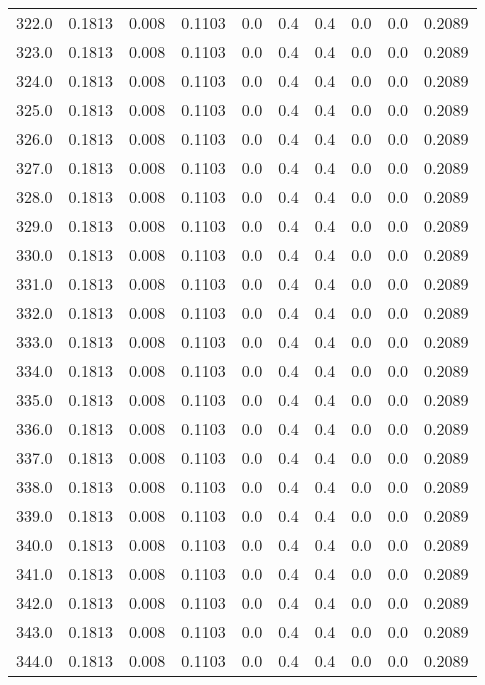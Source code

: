 \begin{longtable}{lrrrrrrrrr}
322.0 & 0.1813 & 0.008 & 0.1103 & 0.0 & 0.4 & 0.4 & 0.0 & 0.0 & 0.2089 \\
323.0 & 0.1813 & 0.008 & 0.1103 & 0.0 & 0.4 & 0.4 & 0.0 & 0.0 & 0.2089 \\
324.0 & 0.1813 & 0.008 & 0.1103 & 0.0 & 0.4 & 0.4 & 0.0 & 0.0 & 0.2089 \\
325.0 & 0.1813 & 0.008 & 0.1103 & 0.0 & 0.4 & 0.4 & 0.0 & 0.0 & 0.2089 \\
326.0 & 0.1813 & 0.008 & 0.1103 & 0.0 & 0.4 & 0.4 & 0.0 & 0.0 & 0.2089 \\
327.0 & 0.1813 & 0.008 & 0.1103 & 0.0 & 0.4 & 0.4 & 0.0 & 0.0 & 0.2089 \\
328.0 & 0.1813 & 0.008 & 0.1103 & 0.0 & 0.4 & 0.4 & 0.0 & 0.0 & 0.2089 \\
329.0 & 0.1813 & 0.008 & 0.1103 & 0.0 & 0.4 & 0.4 & 0.0 & 0.0 & 0.2089 \\
330.0 & 0.1813 & 0.008 & 0.1103 & 0.0 & 0.4 & 0.4 & 0.0 & 0.0 & 0.2089 \\
331.0 & 0.1813 & 0.008 & 0.1103 & 0.0 & 0.4 & 0.4 & 0.0 & 0.0 & 0.2089 \\
332.0 & 0.1813 & 0.008 & 0.1103 & 0.0 & 0.4 & 0.4 & 0.0 & 0.0 & 0.2089 \\
333.0 & 0.1813 & 0.008 & 0.1103 & 0.0 & 0.4 & 0.4 & 0.0 & 0.0 & 0.2089 \\
334.0 & 0.1813 & 0.008 & 0.1103 & 0.0 & 0.4 & 0.4 & 0.0 & 0.0 & 0.2089 \\
335.0 & 0.1813 & 0.008 & 0.1103 & 0.0 & 0.4 & 0.4 & 0.0 & 0.0 & 0.2089 \\
336.0 & 0.1813 & 0.008 & 0.1103 & 0.0 & 0.4 & 0.4 & 0.0 & 0.0 & 0.2089 \\
337.0 & 0.1813 & 0.008 & 0.1103 & 0.0 & 0.4 & 0.4 & 0.0 & 0.0 & 0.2089 \\
338.0 & 0.1813 & 0.008 & 0.1103 & 0.0 & 0.4 & 0.4 & 0.0 & 0.0 & 0.2089 \\
339.0 & 0.1813 & 0.008 & 0.1103 & 0.0 & 0.4 & 0.4 & 0.0 & 0.0 & 0.2089 \\
340.0 & 0.1813 & 0.008 & 0.1103 & 0.0 & 0.4 & 0.4 & 0.0 & 0.0 & 0.2089 \\
341.0 & 0.1813 & 0.008 & 0.1103 & 0.0 & 0.4 & 0.4 & 0.0 & 0.0 & 0.2089 \\
342.0 & 0.1813 & 0.008 & 0.1103 & 0.0 & 0.4 & 0.4 & 0.0 & 0.0 & 0.2089 \\
343.0 & 0.1813 & 0.008 & 0.1103 & 0.0 & 0.4 & 0.4 & 0.0 & 0.0 & 0.2089 \\
344.0 & 0.1813 & 0.008 & 0.1103 & 0.0 & 0.4 & 0.4 & 0.0 & 0.0 & 0.2089 \\

\end{longtable}

